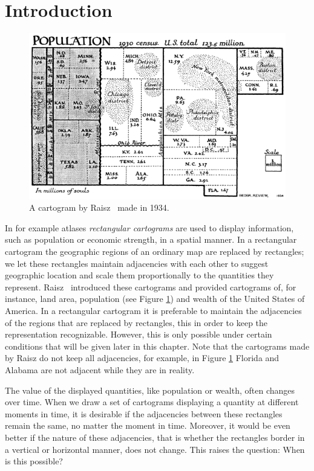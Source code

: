 
\section{Introduction}
\thispagestyle{plain}


  \begin{figure}[!t]
    \centering
    \includegraphics[scale=.5]{introduction/img/cartogram.png}
    \caption{A cartogram by Raisz~\cite{Raisz1934} made in 1934.}
    \label{fig:intro:raisz}
  \end{figure}
  In for example atlases \emph{rectangular cartograms} are used to display information, such as population or economic strength, in a spatial manner.
  In a rectangular cartogram  the geographic regions of an ordinary map are replaced by rectangles; we let these rectangles maintain adjacencies with each other to suggest geographic location and scale them proportionally to the quantities they represent.
  Raisz~\cite{Raisz1934} introduced these cartograms and provided cartograms of, for instance, land area, population (see Figure  \ref{fig:intro:raisz}) and wealth of the United States of America.
  In a rectangular cartogram it is preferable to maintain the adjacencies of the regions that are replaced by rectangles, this in order to keep the representation recognizable.
  However, this is only possible under certain conditions that will be given later in this chapter.
  Note that the cartograms made by Raisz do not keep all adjacencies, for example, in Figure \ref{fig:intro:raisz} Florida and Alabama are not adjacent while they are in reality.

  The value of the displayed quantities, like population or wealth, often changes over time.
  When we draw a set of cartograms displaying a quantity at different moments in time, it is desirable if the adjacencies between these rectangles remain the same, no matter the moment in time.
  Moreover, it would be even better if the nature of these adjacencies, that is whether the rectangles border in a vertical or horizontal manner, does not change.
  This raises the question: When is this possible?

